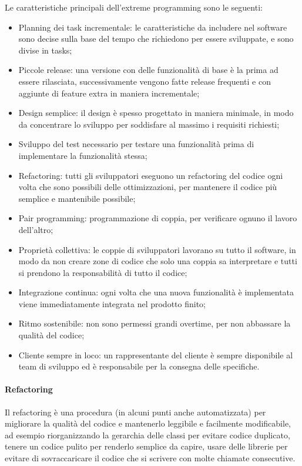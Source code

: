 \documentclass[a4paper, 10pt]{article}
\begin{document}
		Le caratteristiche principali dell'extreme programming sono le seguenti:
		\begin{itemize}
			\item Planning dei task incrementale: le caratteristiche da includere nel software sono decise sulla base del tempo che richiedono per essere sviluppate, e sono divise in tasks;
			
			\item Piccole release: una versione con delle funzionalità di base è la prima ad essere rilasciata, successivamente vengono fatte release frequenti e con aggiunte di feature extra in maniera incrementale;
			
			\item Design semplice: il design è spesso progettato in maniera minimale, in modo da concentrare lo sviluppo per soddisfare al massimo i requisiti richiesti;
			
			\item Sviluppo del test necessario per testare una funzionalità prima di implementare la funzionalità stessa;
			
			\item Refactoring: tutti gli sviluppatori eseguono un refactoring del codice ogni volta che sono possibili delle ottimizzazioni, per mantenere il codice più semplice e mantenibile possibile;
			
			\item Pair programming: programmazione di coppia, per verificare ognuno il lavoro dell'altro;
			
			\item Proprietà collettiva: le coppie di sviluppatori lavorano su tutto il software, in modo da non creare zone di codice che solo una coppia sa interpretare e tutti si prendono la responsabilità di tutto il codice;
			
			\item Integrazione continua: ogni volta che una nuova funzionalità è implementata viene immediatamente integrata nel prodotto finito;
			
			\item Ritmo sostenibile: non sono permessi grandi overtime, per non abbassare la qualità del codice;
			
			\item Cliente sempre in loco: un rappresentante del cliente è sempre disponibile al team di sviluppo ed è responsabile per la consegna delle specifiche.
		\end{itemize}
		
		\paragraph{Refactoring} Il refactoring è una procedura (in alcuni punti anche automatizzata) per migliorare la qualità del codice e mantenerlo leggibile e facilmente modificabile, ad esempio riorganizzando la gerarchia delle classi per evitare codice duplicato, tenere un codice pulito per renderlo semplice da capire, usare delle librerie per evitare di sovraccaricare il codice che si scrivere con molte chiamate consecutive.
		
\end{document}
